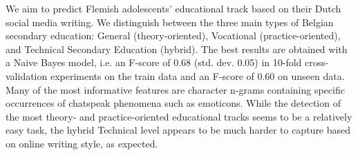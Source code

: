 We aim to predict Flemish adolescents' educational track based on their Dutch social media writing. We distinguish between the three main types of Belgian secondary education: General (theory-oriented), Vocational (practice-oriented), and Technical Secondary Education (hybrid). The best results are obtained with a Naive Bayes model, i.e. an F-score of 0.68 (std. dev. 0.05) in 10-fold cross-validation experiments on the train data and an F-score of 0.60 on unseen data. Many of the most informative features are character n-grams containing specific occurrences of chatspeak phenomena such as emoticons. While the detection of the most theory- and practice-oriented educational tracks seems to be a relatively easy task, the hybrid Technical level appears to be much harder to capture based on online writing style, as expected.
